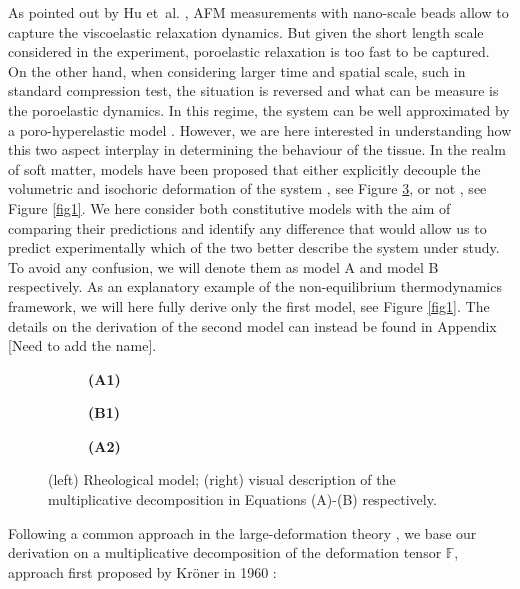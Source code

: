 \documentclass[runningheads]{llncs}
\newcommand{\F}{\ensuremath{\mathbb{F}}}
\begin{document}
As pointed out by Hu et~al. \cite{viscoporo}, AFM measurements with nano-scale beads allow to capture the viscoelastic relaxation dynamics. But given the short length scale considered in the experiment, poroelastic relaxation is too fast to be captured. On the other hand, when considering larger time and spatial scale, such in standard compression test, the situation is reversed and what can be measure is the poroelastic dynamics. In this regime, the system can be well approximated by a poro-hyperelastic model \cite{Reviewpolyel,ecm2}. However, we are here interested in understanding how this two aspect interplay in determining the behaviour of the tissue. In the realm of soft matter, models have been proposed that either explicitly decouple the volumetric and isochoric deformation of the system \cite{magneto,NGUYEN}, see Figure \ref{Model2}, or not \cite{Article1,CACCAVO2}, see Figure \ref{fig1}. We here consider both constitutive models with the aim of comparing their predictions and identify any difference that would allow us to predict experimentally which of the two better describe the system under study. To avoid any confusion, we will denote them as model A and model B respectively. As an explanatory example of the non-equilibrium thermodynamics framework, we will here fully derive only the first model, see Figure \ref{fig1}. The details on the derivation of the second model can instead be found in Appendix [Need to add the name]. 
\begin{figure}[h!]
	\begin{subfigure}{0.49\textwidth}
		\centering
	\def\svgwidth{0.78\linewidth}
	
	\caption*{\textbf{(A1)}}
	\label{fig1A}
	\end{subfigure}
	\begin{subfigure}{0.49\textwidth}
	\centering
	\def\svgwidth{0.78\linewidth}
	
	\caption*{\textbf{(B1)}}
	\label{fig1B}
\end{subfigure}


\begin{subfigure}{1\textwidth}
	\centering
	\LARGE
	\def\svgwidth{0.75\linewidth}
	
	\caption*{\textbf{(A2)}}
	\label{Model2}
\end{subfigure}
\vspace{5mm}
\caption{(left) Rheological model; (right) visual description of the multiplicative decomposition in Equations (A)-(B) respectively.}
\label{figmode}
\end{figure}
Following a common approach in the large-deformation theory \cite{Article1,CACCAVO2,Plasto,magneto,NGUYEN,growthtum}, we base our derivation on a multiplicative decomposition of the deformation tensor $\F$, approach first proposed by Kr\"{o}ner in 1960 \cite{kro}:
\end{document}
